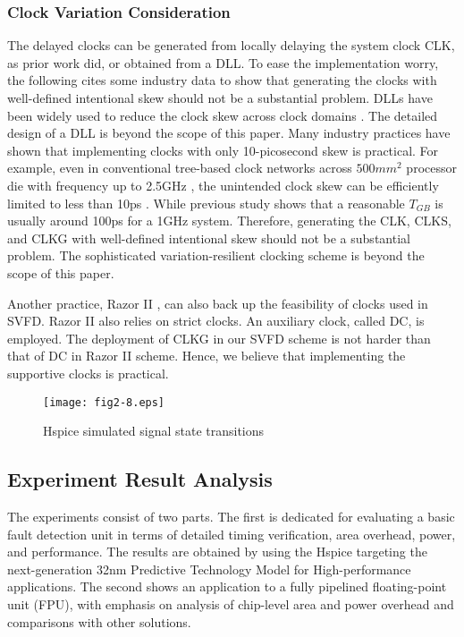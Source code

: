 \subsubsection{Clock Variation Consideration}
The delayed clocks can be generated from locally delaying the system clock CLK, as prior work \cite{failure_prediction_07} did, or obtained from a DLL. To ease the implementation worry, the following cites some industry data to show that generating the clocks with well-defined intentional skew should not be a substantial problem. DLLs have been widely used to reduce the clock skew across clock domains \cite{clock_01}\cite{DLL_00}\cite{DLL2_04}. The detailed design of a DLL is beyond the scope of this paper. Many industry practices have shown that implementing clocks with only 10-picosecond skew is practical. For example, even in conventional tree-based clock networks across $500mm^2$ processor die with frequency up to 2.5GHz , the unintended clock skew can be efficiently limited to less than 10ps \cite{Itanium_clock05}. While previous study \cite{failure_prediction_07} shows that a reasonable $T_{GB}$ is usually around 100ps for a 1GHz system. Therefore, generating the CLK, CLKS, and CLKG with well-defined intentional skew should not be a substantial problem. The sophisticated variation-resilient clocking scheme is beyond the scope of this paper.

Another practice, Razor II \cite{Razor2_ISSCC08}, can also back up the feasibility of clocks used in SVFD.  Razor II also relies on strict clocks. An auxiliary clock, called DC, is employed. The deployment of CLKG in our SVFD scheme is not harder than that of DC in Razor II scheme. Hence, we believe that implementing the supportive clocks is practical.


\begin{figure}
\centering
\texttt{[image: fig2-8.eps]}
\caption{Hspice simulated signal state transitions}\label{spice}
\end{figure}


\subsection{Experiment Result Analysis}
The experiments consist of two parts. The first is dedicated for evaluating a basic fault detection unit in terms of detailed timing verification, area overhead, power, and performance. The results are obtained by using the Hspice targeting the next-generation 32nm Predictive Technology Model \cite{PTM_06} for High-performance applications.  The second shows an application to a fully pipelined floating-point unit (FPU), with emphasis on analysis of chip-level area and power overhead and comparisons with other solutions.

